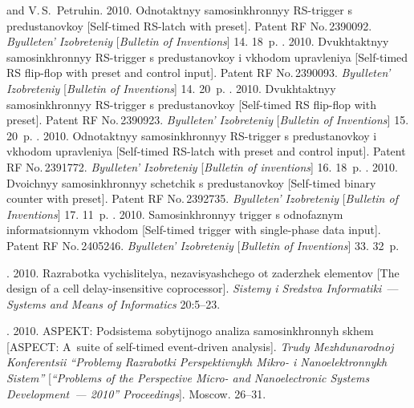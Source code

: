 \begin{multicols}{2}
{{\begin{thebibliography}{99}
{and V.\,S.~Petruhin}. 2010. Odnotaktnyy samosinkhronnyy RS-trigger s predustanovkoy 
[Self-timed RS-latch with preset]. Patent RF No.\,2390092. 
\textit{Byulleten' Izobreteniy} [\textit{Bulletin of Inventions}] 14. 18~p.
. 2010. Dvukhtaktnyy samosinkhronnyy RS-trigger s predustanovkoy
i vkhodom upravleniya 
[Self-timed RS flip-flop with preset and control input]. Patent RF No.\,2390093. 
\textit{Byulleten' Izobreteniy} [\textit{Bulletin of Inventions}] 14. 20~p.
. 
2010. Dvukhtaktnyy samosinkhronnyy RS-trigger s predustanovkoy
[Self-timed RS flip-flop with preset]. Patent RF No.\,2390923. 
\textit{Byulleten' Izobreteniy} [\textit{Bulletin of Inventions}] 15. 20~p.
. 
2010. Odnotaktnyy samosinkhronnyy RS-trigger s pred\-usta\-nov\-koy i vkhodom upravleniya 
[Self-timed RS-latch with preset and control input]. Patent RF No.\,2391772. 
\textit{Byulleten' Izobreteniy} [\textit{Bulletin of inventions}] 16. 18~p.
. 
2010. Dvoichnyy samosinkhronnyy schetchik s pred\-usta\-nov\-koy
[Self-timed binary counter with preset]. Patent RF No.\,2392735. 
\textit{Byulleten' Izobreteniy} [\textit{Bulletin of Inventions}] 17. 11~p.
. 
2010. Samosinkhronnyy trigger s odnofaznym in\-for\-ma\-tsi\-on\-nym vkhodom 
[Self-timed trigger with single-phase data input]. Patent RF No.\,2405246. 
\textit{Byulleten' Izobreteniy} [\textit{Bulletin of Inventions}] 33. 32~p.

. 2010. Razrabotka vychislitelya, nezavisyashchego ot zaderzhek 
ele\-men\-tov [The design of a cell delay-insensitive coprocessor]. 
\textit{Sistemy i Sredstva Informatiki}~--- \textit{Systems and Means of Informatics} 
20:5--23.

. 
2010. ASPEKT: Podsistema sobytijnogo analiza samosinkhronnyh skhem 
[ASPECT: A~suite of self-timed event-driven analysis].  
\textit{Trudy Mezhdunarodnoj Konferentsii 
``Problemy Razrabotki Perspektivnykh Mikro- i Nanoelektronnykh Sistem''} 
[\textit{``Problems of the Perspective Micro- and Nanoelectronic Systems Development~--- 2010''
Proceedings}]. Moscow. 26--31. 


\end{thebibliography}}}
\end{multicols}
